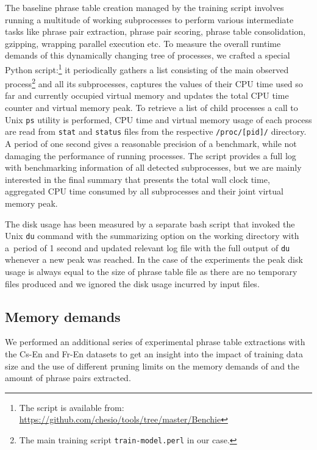 The baseline phrase table creation managed by the training script involves
running a multitude of working subprocesses to perform various intermediate
tasks like phrase pair extraction, phrase pair scoring, phrase table
consolidation, gzipping, wrapping parallel execution etc.
To measure the overall runtime demands of this dynamically changing tree
of processes, we crafted a special Python script:\footnote{The script is available
from: \url{https://github.com/chesio/tools/tree/master/Benchie}}
it periodically gathers a list consisting of the main observed
process\footnote{The main training script \texttt{train-model.perl} in our case.}
and all its subprocesses, captures the values of their CPU time used so far
and currently occupied virtual memory and updates the total CPU time counter
and virtual memory peak.
To retrieve a list of child processes a call to Unix \verb|ps| utility is
performed, CPU time and virtual memory usage of each process are read from
\verb|stat| and \verb|status| files from the respective \verb|/proc/[pid]/|
directory.
A period of one second gives a reasonable precision of a benchmark, while
not damaging the performance of running processes.
The script provides a full log with benchmarking information of all detected
subprocesses, but we are mainly interested in the final summary that presents
the total wall clock time, aggregated CPU time consumed by all subprocesses
and their joint virtual memory peak.

The disk usage has been measured by a separate bash script that invoked the Unix
\texttt{du} command with the summarizing option on the working directory with
a~period of 1 second and updated relevant log file with the full output of
\texttt{du} whenever a new peak was reached.
In the case of the \eppex{} experiments the peak disk usage is always equal to the
size of phrase table file as there are no temporary files produced and we
ignored the disk usage incurred by input files.

\subsection{Memory demands}
\label{sec:memory-benchmarking}

We performed an additional series of experimental phrase table extractions with
the Cs-En and Fr-En datasets to get an insight into the impact of training data size and
the use of different pruning limits on the memory demands of \eppex{} and the amount of phrase pairs
extracted.

